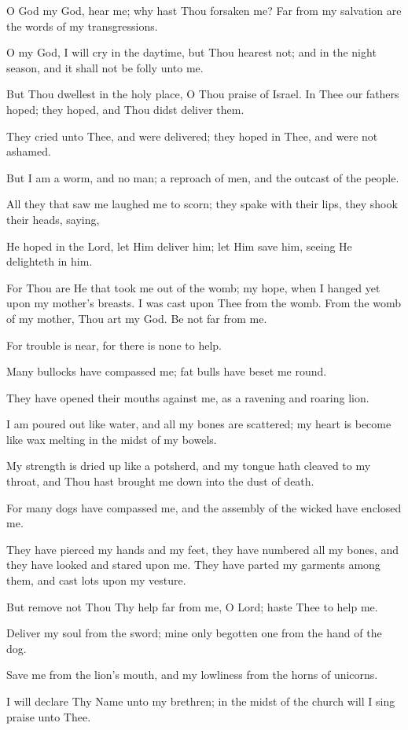 O God my God, hear me; why hast Thou forsaken me? Far from my salvation are the words of my transgressions.

O my God, I will cry in the daytime, but Thou hearest not; and in the night season, and it shall not be folly unto me.

But Thou dwellest in the holy place, O Thou praise of Israel. In Thee our fathers hoped; they hoped, and Thou didst deliver them.

They cried unto Thee, and were delivered; they hoped in Thee, and were not ashamed.

But I am a worm, and no man; a reproach of men, and the outcast of the people.

All they that saw me laughed me to scorn; they spake with their lips, they shook their heads, saying,

He hoped in the Lord, let Him deliver him; let Him save him, seeing He delighteth in him.

For Thou are He that took me out of the womb; my hope, when I hanged yet upon my mother's breasts. I was cast upon Thee from the womb. From the womb of my mother, Thou art my God. Be not far from me.

For trouble is near, for there is none to help.

Many bullocks have compassed me; fat bulls have beset me round.

They have opened their mouths against me, as a ravening and roaring lion.

I am poured out like water, and all my bones are scattered; my heart is become like wax melting in the midst of my bowels.

My strength is dried up like a potsherd, and my tongue hath cleaved to my throat, and Thou hast brought me down into the dust of death.

For many dogs have compassed me, and the assembly of the wicked have enclosed me.

They have pierced my hands and my feet, they have numbered all my bones, and they have looked and stared upon me. They have parted my garments among them, and cast lots upon my vesture.

But remove not Thou Thy help far from me, O Lord; haste Thee to help me.

Deliver my soul from the sword; mine only begotten one from the hand of the dog.

Save me from the lion's mouth, and my lowliness from the horns of unicorns.

I will declare Thy Name unto my brethren; in the midst of the church will I sing praise unto Thee.

